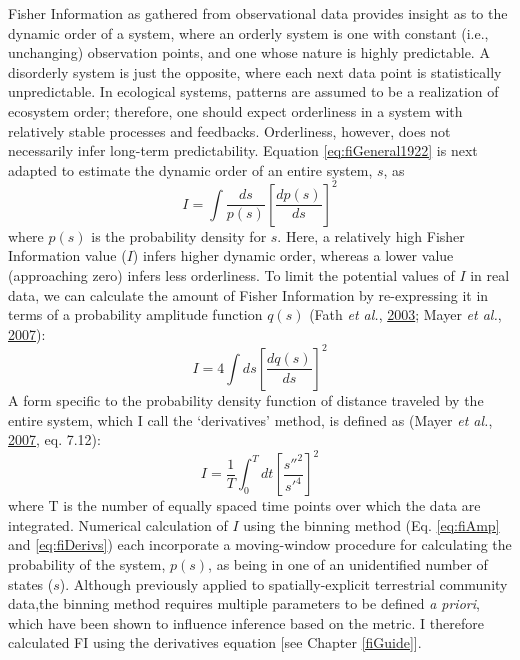 \documentclass[12pt,twoside,openany]{reedthesis}
\begin{document}
Fisher Information as gathered from observational data provides insight as to the dynamic order of a system, where an orderly system is one with constant (i.e., unchanging) observation points, and one whose nature is highly predictable. A disorderly system is just the opposite, where each next data point is statistically unpredictable. In ecological systems, patterns are assumed to be a realization of ecosystem order; therefore, one should expect orderliness in a system with relatively stable processes and feedbacks. Orderliness, however, does not necessarily infer long-term predictability. Equation \eqref{eq:fiGeneral1922} is next adapted to estimate the dynamic order of an entire system, \(s\), as
\begin{equation} 
  I = \int \frac{ds}{p(s)}\left[\frac{dp(s)}{ds}\right]^2
  \label{eq:fi73c}
\end{equation}
where \(p(s)\) is the probability density for \(s\). Here, a relatively high Fisher Information value (\(I\)) infers higher dynamic order, whereas a lower value (approaching zero) infers less orderliness. To limit the potential values of \(I\) in real data, we can calculate the amount of Fisher Information by re-expressing it in terms of a probability amplitude function \(q(s)\) (Fath \emph{et al.}, \protect\hyperlink{ref-fath_regime_2003}{2003}; Mayer \emph{et al.}, \protect\hyperlink{ref-mayer_applications_2007}{2007}):
\begin{equation}
  I = 4 \int ds\left[\frac{dq(s)}{ds}\right]^2
  \label{eq:fiAmp}
\end{equation}
A form specific to the probability density function of distance traveled by the entire system, which I call the `derivatives' method, is defined as (Mayer \emph{et al.}, \protect\hyperlink{ref-mayer_applications_2007}{2007}, eq. 7.12):
\begin{equation}
  I = \frac{1}{T} \int_0^T dt\left[\frac{s''^2}{s'^4}\right]^2
  \label{eq:fiDerivs}
\end{equation}
where T is the number of equally spaced time points over which the data are integrated. Numerical calculation of \(I\) using the binning method (Eq. \eqref{eq:fiAmp} and \eqref{eq:fiDerivs}) each incorporate a moving-window procedure for calculating the probability of the system, \(p(s)\), as being in one of an unidentified number of states (\(s\)). Although previously applied to spatially-explicit terrestrial community data,the binning method requires multiple parameters to be defined \emph{a priori}, which have been shown to influence inference based on the metric. I therefore calculated FI using the derivatives equation {[}see Chapter \ref{fiGuide}{]}.
\end{document}
